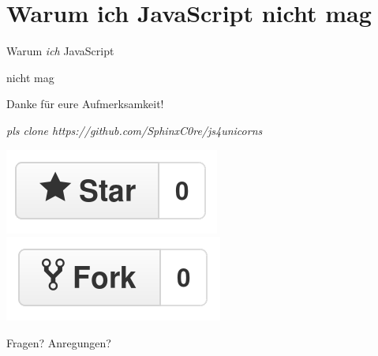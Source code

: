 \documentclass{beamer}
\begin{document}

\section{Warum ich JavaScript nicht mag}

\begin{frame}
\Huge{
\centerline{Warum \textit{ich} JavaScript}
\centerline{nicht mag}
}
\end{frame}


\begin{frame}
\Huge{\centerline{Danke für eure Aufmerksamkeit!}}

\begin{normalsize}

\centerline{\textit{pls clone https://github.com/SphinxC0re/js4unicorns}}
\centerline{\includegraphics[scale=0.2]{assets/like_button.png} \includegraphics[scale=0.2]{assets/dislike_button.png}}
\end{normalsize}
\end{frame}

\begin{frame}
\Huge{\centerline{Fragen? Anregungen?}}
\end{frame}

\end{document}
